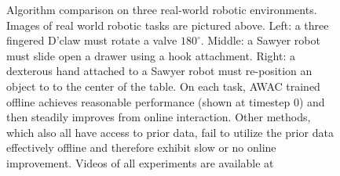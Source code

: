 \begin{figure}[t]
    \caption{
    Algorithm comparison on three real-world robotic environments. Images of real world robotic tasks are pictured above. Left: a three fingered D'claw must rotate a valve $180^\circ$. Middle: a Sawyer robot must slide open a drawer using a hook attachment. Right: a dexterous hand attached to a Sawyer robot must re-position an object to to the center of the table. On each task, AWAC trained offline achieves reasonable performance (shown at timestep 0) and then steadily improves from online interaction. Other methods, which also all have access to prior data, fail to utilize the prior data effectively offline and therefore exhibit slow or no online improvement. Videos of all experiments are available at \projectpage
    }
    \label{fig:robot-learning-curves}
\end{figure}
